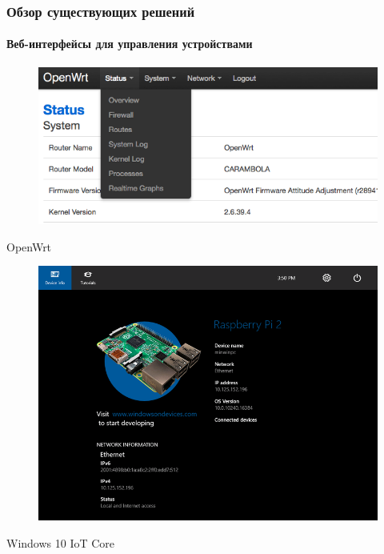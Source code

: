 \documentclass[xetex,t]{beamer}
\begin{document}
%
%
\begin{frame}
  \frametitle{Обзор существующих решений}
  \framesubtitle{Веб-интерфейсы для управления устройствами}
  \vskip 1cm
  \begin{minipage}{\textwidth}
    \centering
    \begin{minipage}[c]{.45\textwidth}
      \centering
      \begin{figure}[h]
        \centering
        \includegraphics[width=\textwidth]{../img/openwrt-menu}
      \end{figure}
      OpenWrt
    \end{minipage}
    \hspace{1em}
    \begin{minipage}[c]{.45\textwidth}
      \centering
      \begin{figure}[h]
        \centering
        \includegraphics[width=\textwidth]{../img/win10-device-info}
      \end{figure}
      Windows 10 IoT Core
    \end{minipage}
  \end{minipage}
\end{frame}
\end{document}
